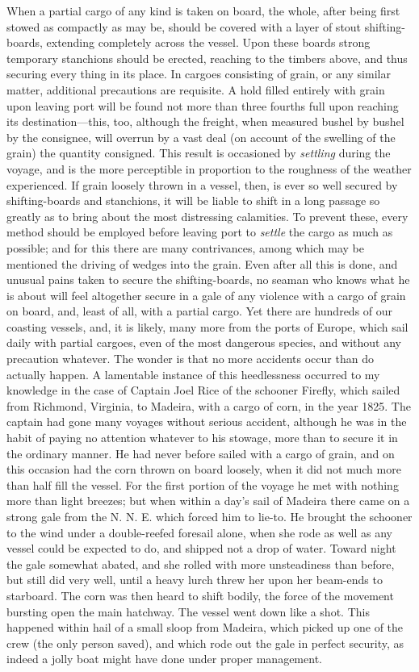 When a partial cargo of any kind is taken on board, the whole, after being
first stowed as compactly as may be, should be covered with a layer of stout
shifting-boards, extending completely across the vessel. Upon these boards
strong temporary stanchions should be erected, reaching to the timbers above,
and thus securing every thing in its place. In cargoes consisting of grain, or
any similar matter, additional precautions are requisite. A hold filled entirely
with grain upon leaving port will be found not more than three fourths full upon
reaching its destination---this, too, although the freight, when measured bushel
by bushel by the consignee, will overrun by a vast deal (on account of the
swelling of the grain) the quantity consigned. This result is occasioned by
\emph{settling} during the voyage, and is the more perceptible in proportion to
the roughness of the weather experienced. If grain loosely thrown in a vessel,
then, is ever so well secured by shifting-boards and stanchions, it will be
liable to shift in a long passage so greatly as to bring about the most
distressing calamities. To prevent these, every method should be employed before
leaving port to \emph{settle} the cargo as much as possible; and for this there
are many contrivances, among which may be mentioned the driving of wedges into
the grain. Even after all this is done, and unusual pains taken to secure the
shifting-boards, no seaman who knows what he is about will feel altogether
secure in a gale of any violence with a cargo of grain on board, and, least of
all, with a partial cargo. Yet there are hundreds of our coasting vessels, and,
it is likely, many more from the ports of Europe, which sail daily with partial
cargoes, even of the most dangerous species, and without any precaution
whatever. The wonder is that no more accidents occur than do actually happen. A
lamentable instance of this heedlessness occurred to my knowledge in the case of
Captain Joel Rice of the schooner Firefly, which sailed from Richmond, Virginia,
to Madeira, with a cargo of corn, in the year 1825. The captain had gone many
voyages without serious accident, although he was in the habit of paying no
attention whatever to his stowage, more than to secure it in the ordinary
manner. He had never before sailed with a cargo of grain, and on this occasion
had the corn thrown on board loosely, when it did not much more than half fill
the vessel. For the first portion of the voyage he met with nothing more than
light breezes; but when within a day's sail of Madeira there came on a strong
gale from the N. N. E. which forced him to lie-to. He brought the schooner to
the wind under a double-reefed foresail alone, when she rode as well as any
vessel could be expected to do, and shipped not a drop of water. Toward night
the gale somewhat abated, and she rolled with more unsteadiness than before, but
still did very well, until a heavy lurch threw her upon her beam-ends to
starboard. The corn was then heard to shift bodily, the force of the movement
bursting open the main hatchway. The vessel went down like a shot. This happened
within hail of a small sloop from Madeira, which picked up one of the crew (the
only person saved), and which rode out the gale in perfect security, as indeed a
jolly boat might have done under proper management. 

